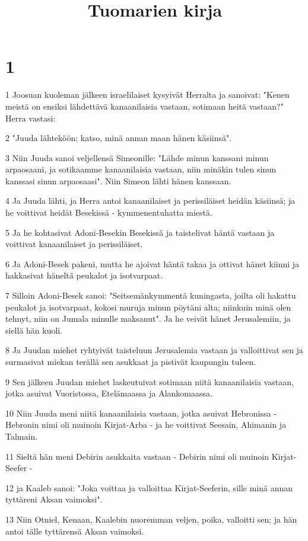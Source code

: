 

\title{Tuomarien kirja}


\chapter{1}

\par 1 Joosuan kuoleman jälkeen israelilaiset kysyivät Herralta ja sanoivat: "Kenen meistä on ensiksi lähdettävä kanaanilaisia vastaan, sotimaan heitä vastaan?" Herra vastasi:
\par 2 "Juuda lähteköön; katso, minä annan maan hänen käsiinsä".
\par 3 Niin Juuda sanoi veljellensä Simeonille: "Lähde minun kanssani minun arpaosaani, ja sotikaamme kanaanilaisia vastaan, niin minäkin tulen sinun kanssasi sinun arpaosaasi". Niin Simeon lähti hänen kanssaan.
\par 4 Ja Juuda lähti, ja Herra antoi kanaanilaiset ja perissiläiset heidän käsiinsä; ja he voittivat heidät Besekissä - kymmenentuhatta miestä.
\par 5 Ja he kohtasivat Adoni-Besekin Besekissä ja taistelivat häntä vastaan ja voittivat kanaanilaiset ja perissiläiset.
\par 6 Ja Adoni-Besek pakeni, mutta he ajoivat häntä takaa ja ottivat hänet kiinni ja hakkasivat häneltä peukalot ja isotvarpaat.
\par 7 Silloin Adoni-Besek sanoi: "Seitsemänkymmentä kuningasta, joilta oli hakattu peukalot ja isotvarpaat, kokosi muruja minun pöytäni alta; niinkuin minä olen tehnyt, niin on Jumala minulle maksanut". Ja he veivät hänet Jerusalemiin, ja siellä hän kuoli.
\par 8 Ja Juudan miehet ryhtyivät taisteluun Jerusalemia vastaan ja valloittivat sen ja surmasivat miekan terällä sen asukkaat ja pistivät kaupungin tuleen.
\par 9 Sen jälkeen Juudan miehet laskeutuivat sotimaan niitä kanaanilaisia vastaan, jotka asuivat Vuoristossa, Etelämaassa ja Alankomaassa.
\par 10 Niin Juuda meni niitä kanaanilaisia vastaan, jotka asuivat Hebronissa - Hebronin nimi oli muinoin Kirjat-Arba - ja he voittivat Seesain, Ahimanin ja Talmain.
\par 11 Sieltä hän meni Debirin asukkaita vastaan - Debirin nimi oli muinoin Kirjat-Seefer -
\par 12 ja Kaaleb sanoi: "Joka voittaa ja valloittaa Kirjat-Seeferin, sille minä annan tyttäreni Aksan vaimoksi".
\par 13 Niin Otniel, Kenaan, Kaalebin nuoremman veljen, poika, valloitti sen; ja hän antoi tälle tyttärensä Aksan vaimoksi.
